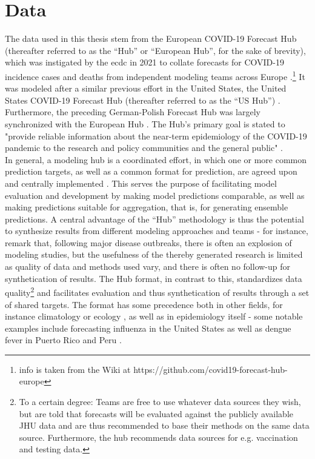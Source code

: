 \section{Data}
The data used in this thesis stem from the European COVID-19 Forecast Hub (thereafter referred to as the ``Hub'' or ``European Hub'', for the sake of brevity), which was instigated by the \ac{ecdc} in 2021 to collate forecasts for COVID-19 incidence cases and deaths from independent modeling teams across Europe \citep{european_covid-19_forecast_hub_european_2021}.\footnote{info is taken from the Wiki at https://github.com/covid19-forecast-hub-europe} It was modeled after a similar previous effort in the United States, the United States COVID-19 Forecast Hub (thereafter referred to as the ``US Hub'') \citep{cramer_united_2021}. Furthermore, the preceding German-Polish Forecast Hub was largely synchronized with the European Hub \citep{bracher_german_2020}. The Hub's primary goal is stated to "provide reliable information about the near-term epidemiology of the COVID-19 pandemic to the research and policy communities and the general public" \citep{sherratt_predictive_2022}.\\ 
In general, a modeling hub is a coordinated effort, in which one or more common prediction targets, as well as a common format for prediction, are agreed upon and centrally implemented \citep{reich_collaborative_2022}. This serves the purpose of facilitating model evaluation and development by making model predictions comparable, as well as making predictions suitable for aggregation, that is, for generating ensemble predictions. A central advantage of the ``Hub'' methodology is thus the potential to synthesize results from different modeling approaches and teams - for instance, \cite{metcalf_opportunities_2017} remark that, following major disease outbreaks, there is often an explosion of modeling studies, but the usefulness of the thereby generated research is limited as quality of data and methods used vary, and there is often no follow-up for synthetication of results. %
The Hub format, in contrast to this, standardizes data quality\footnote{To a certain degree: Teams are free to use whatever data sources they wish, but are told that forecasts will be evaluated against the publicly available JHU data and are thus recommended to base their methods on the same data source. Furthermore, the hub recommends data sources for e.g. vaccination and testing data.} and facilitates evaluation and thus synthetication of results through a set of shared targets. The format has some precedence both in other fields, for instance climatology or ecology \citep{warszawski_inter-sectoral_2014}, as well as in epidemiology itself - some notable examples include forecasting influenza in the United States \citep{reich_collaborative_2019} as well as dengue fever in Puerto Rico and Peru \citep{johansson_open_2019}. \\
